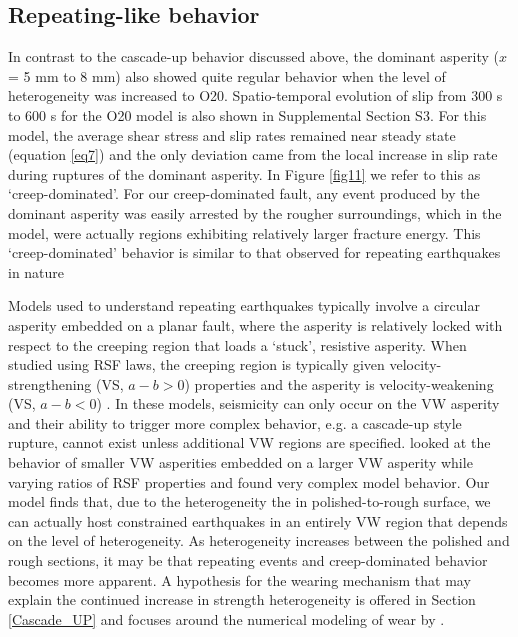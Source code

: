 \documentclass[preprint,1p, 10pt,authoryear]{elsarticle}
\begin{document}
\subsection{Repeating-like behavior}
In contrast to the cascade-up behavior discussed above, the dominant asperity ($x$ = 5 mm to 8 mm) also showed quite regular behavior when the level of heterogeneity was increased to O20.  Spatio-temporal evolution of slip from 300 s to 600 s for the O20 model is also shown in Supplemental Section S3. For this model, the average shear stress and slip rates remained near steady state (equation \eqref{eq7}) and the only deviation came from the local increase in slip rate during ruptures of the dominant asperity.  In Figure \ref{fig11} we refer to this as `creep-dominated'. For our creep-dominated fault, any event produced by the dominant asperity was easily arrested by the rougher surroundings, which in the model, were actually regions exhibiting relatively larger fracture energy.  This `creep-dominated' behavior is similar to that observed for repeating earthquakes in nature \citep[e.g., ][]{Beeler2001,Uchida2019}

Models used to understand repeating earthquakes typically involve a circular asperity embedded on a planar fault, where the asperity is relatively locked with respect to the creeping region that loads a `stuck', resistive asperity. When studied using RSF laws, the creeping region is typically given velocity-strengthening (VS, $a-b>0$) properties and the asperity is velocity-weakening  (VS, $a-b<0$) \citep{Kato2003,Chen2009}. In these models, seismicity can only occur on the VW asperity and their ability to trigger more complex behavior, e.g. a cascade-up style rupture, cannot exist unless additional VW regions are specified. \citet{Noda2013} looked at the behavior of smaller VW asperities embedded on a larger VW asperity while varying ratios of RSF properties and found very complex model behavior. Our model finds that, due to the heterogeneity the in polished-to-rough surface, we can actually host constrained earthquakes in an entirely VW region that depends on the level of heterogeneity.  As heterogeneity increases between the polished and rough sections, it may be that repeating events and creep-dominated behavior becomes more apparent.  A hypothesis for the wearing mechanism that may explain the continued increase in strength heterogeneity is offered in Section \ref{Cascade_UP} and focuses around the numerical modeling of wear by \citet{Aghababaei2016}.
\end{document}
